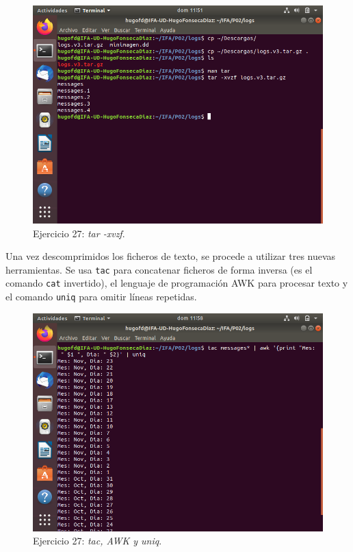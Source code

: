 \documentclass[11pt]{article}
\begin{document}
\begin{figure}[H]
    \caption{Ejercicio 27: \textit{tar -xvzf}.}
  \centering
  \includegraphics[scale=0.7]{e27-1.png}
\end{figure}

Una vez descomprimidos los ficheros de texto, se procede a utilizar tres nuevas herramientas. Se usa \verb|tac| para concatenar ficheros de forma inversa (es el comando \verb|cat| invertido), el lenguaje de programación AWK para procesar texto y el comando \verb|uniq| para omitir líneas repetidas.

\begin{figure}[H]
    \caption{Ejercicio 27: \textit{tac, AWK y uniq}.}
  \centering
  \includegraphics[scale=0.7]{e27-2.png}
\end{figure}
\end{document}
